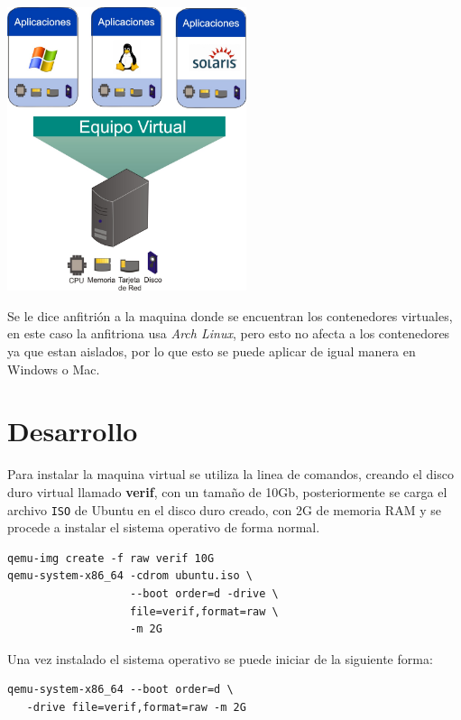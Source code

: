 \documentclass[11pt]{/home/hao/dev/org/latex-plantilla/IEEEtran}
\begin{document}
\begin{center}
\includegraphics[width=7cm]{virtualizacion.jpg}
\end{center}

Se le dice anfitrión a la maquina donde se encuentran los
contenedores virtuales, en este caso la anfitriona usa \emph{Arch
Linux}, pero esto no afecta a los contenedores ya que estan
aislados, por lo que esto se puede aplicar de igual manera en
Windows o Mac.
\section{Desarrollo}
\label{sec:org7edc0b0}
Para instalar la maquina virtual se utiliza la linea de comandos,
creando el disco duro virtual llamado \textbf{verif}, con un tamaño de
10Gb, posteriormente se carga el archivo \texttt{ISO} de Ubuntu en el disco
duro creado, con 2G de memoria RAM y se procede a instalar el
sistema operativo de forma normal.

\begin{verbatim}
qemu-img create -f raw verif 10G
qemu-system-x86_64 -cdrom ubuntu.iso \
                   --boot order=d -drive \
                   file=verif,format=raw \
                   -m 2G
\end{verbatim}

Una vez instalado el sistema operativo se puede iniciar de la
siguiente forma:

\begin{verbatim}
qemu-system-x86_64 --boot order=d \
   -drive file=verif,format=raw -m 2G
\end{verbatim}
\end{document}
